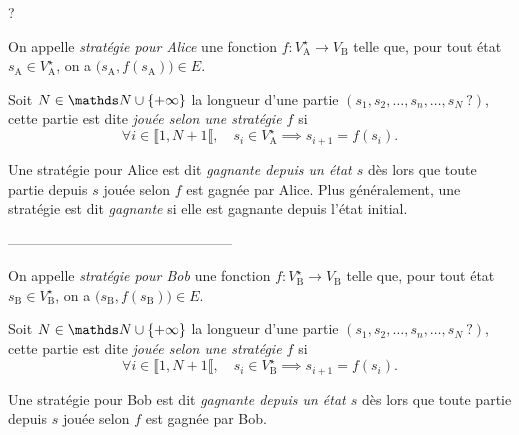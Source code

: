 \begin{exm}
	 ?
\end{exm}

\begin{defn}
	On appelle \textit{stratégie pour Alice} une fonction $f : V_\mathrm{A}^\star \to V_\mathrm{B}$\/ telle que, pour tout état $s_\mathrm{A} \in V_\mathrm{A}^\star$,  on a $\big(s_\mathrm{A}, f(s_\mathrm{A})\big) \in E$.
	
	Soit $N \in \N \cup \{+\infty\}$\/ la longueur d'une partie $(s_1, s_2, \ldots, s_n, \ldots, s_N\:?)$, cette partie est dite \textit{jouée selon une stratégie $f$} si \[
		\forall i \in \llbracket 1, N + 1 \llbracket, \quad s_i \in V_\mathrm{A}^\star  \implies s_{i+1} = f(s_i)
	.\]

	Une stratégie pour Alice est dit \textit{gagnante depuis un état $s$\/} dès lors que toute partie depuis $s$\/ jouée selon $f$ est gagnée par Alice.
	Plus généralement, une stratégie est dit \textit{gagnante} si elle est gagnante depuis l'état initial.

	\bigskip
	\centerline{------------------------------------------------}
	\medskip

	On appelle \textit{stratégie pour Bob} une fonction $f : V_\mathrm{B}^\star \to V_\mathrm{B}$\/ telle que, pour tout état $s_\mathrm{B} \in V_\mathrm{B}^\star$,  on a $\big(s_\mathrm{B}, f(s_\mathrm{B})\big) \in E$.
	
	Soit $N \in \N \cup \{+\infty\}$\/ la longueur d'une partie $(s_1, s_2, \ldots, s_n, \ldots, s_N\:?)$, cette partie est dite \textit{jouée selon une stratégie $f$} si \[
		\forall i \in \llbracket 1, N + 1 \llbracket, \quad s_i \in V_\mathrm{B}^\star  \implies s_{i+1} = f(s_i)
	.\]

	Une stratégie pour Bob est dit \textit{gagnante depuis un état $s$\/} dès lors que toute partie depuis $s$ jouée selon $f$ est gagnée par Bob.
\end{defn}

